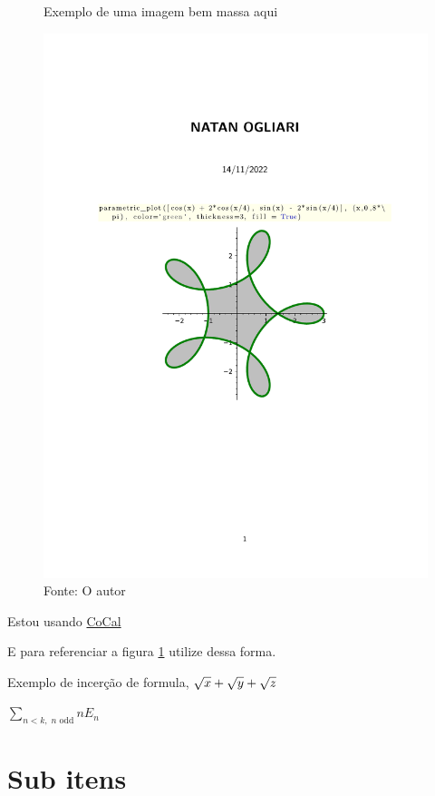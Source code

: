 \begin{figure}[H]
\centering
\caption{Exemplo de uma imagem bem massa aqui}
\includegraphics[width=1\textwidth]{figure/Welcome to CoCalc.pdf}
\caption*{Fonte: O autor}
\label{fig:imagem_massa}
\end{figure}

\par Estou usando \href {https://cocalc.com/} {CoCal}

E para referenciar a figura \ref{fig:imagem_massa} utilize dessa forma.




\par Exemplo de incerção de formula, $ \sqrt{x} + \sqrt{\smash[b]{y}} + \sqrt{z} $


$\sum_{n<k,\;\text{$n$ odd}} nE_n$

\section{Sub itens}

